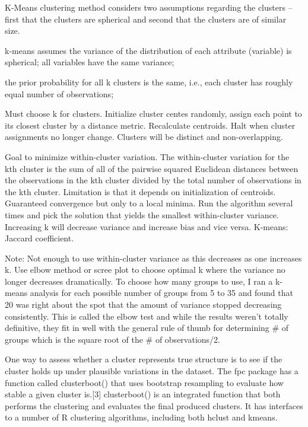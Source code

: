\documentclass[]{book}
\begin{document}
K-Means clustering method considers two assumptions regarding the clusters -- first that the clusters are spherical and second that the clusters are of similar size.

k-means assumes the variance of the distribution of each attribute (variable) is spherical;
all variables have the same variance;

the prior probability for all k clusters is the same, i.e., each cluster has roughly equal number of observations;

Must choose k for clusters. Initialize cluster centes randomly, assign each point to its closest cluster by a distance metric. Recalculate centroids. Halt when cluster assignments no longer change. Clusters will be distinct and non-overlapping.

Goal to minimize within-cluster variation. The within-cluster variation for the kth cluster is the sum of all of the pairwise squared Euclidean distances between the observations in the kth cluster divided by the total number of observations in the kth cluster. Limitation is that it depends on initialization of centroids. Guaranteed convergence but only to a local minima. Run the algorithm several times and pick the solution that yields the smallest within-cluster variance. Increasing k will decrease variance and increase bias and vice versa. K-means: Jaccard coefficient.

Note: Not enough to use within-cluster variance as this decreases as one increases k. Use elbow method or scree plot to choose optimal k where the variance no longer decreases dramatically. To choose how many groups to use, I ran a k-means analysis for each possible number of groups from 5 to 35 and found that 20 was right about the spot that the amount of variance stopped decreasing consistently. This is called the elbow test and while the results weren't totally definitive, they fit in well with the general rule of thumb for determining \# of groups which is the square root of the \# of observations/2.

One way to assess whether a cluster represents true structure is to see if the cluster holds up under plausible variations
in the dataset. The fpc package has a function called clusterboot() that uses bootstrap resampling to evaluate how stable a given cluster is.{[}3{]} clusterboot() is an integrated function that both performs the clustering and evaluates the final produced clusters. It has interfaces to a number of R clustering algorithms, including both hclust and kmeans.
\end{document}
